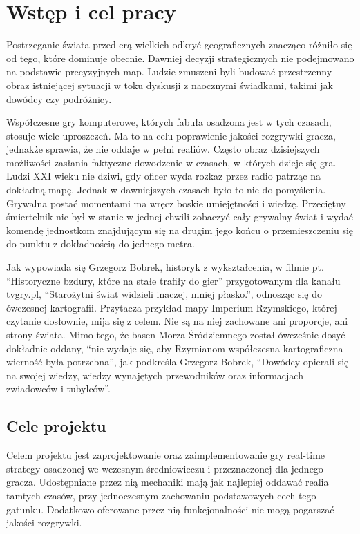 \chapter{Wstęp i cel pracy}\label{chap:introduction}

Postrzeganie świata przed erą wielkich odkryć geograficznych znacząco różniło się od tego, które dominuje obecnie. Dawniej
decyzji strategicznych nie podejmowano na podstawie precyzyjnych map. Ludzie zmuszeni byli  budować  przestrzenny obraz
istniejącej sytuacji  w toku dyskusji z naocznymi świadkami, takimi jak dowódcy czy podróżnicy.

Współczesne gry komputerowe, których fabuła osadzona jest w tych czasach, stosuje wiele uproszczeń. Ma to na celu
poprawienie jakości rozgrywki gracza, jednakże sprawia, że nie oddaje w pełni realiów. Często obraz dzisiejszych
możliwości zasłania faktyczne dowodzenie w czasach, w których dzieje się gra. Ludzi XXI wieku nie dziwi, gdy oficer wyda
rozkaz przez radio patrząc na dokładną mapę. Jednak w dawniejszych czasach było to nie do pomyślenia. Grywalna postać
momentami ma wręcz boskie umiejętności i wiedzę. Przeciętny śmiertelnik nie był w stanie w jednej chwili zobaczyć cały
grywalny świat i wydać komendę jednostkom znajdującym się na drugim jego końcu o przemieszczeniu się do punktu z
dokładnością do jednego metra.

Jak wypowiada się Grzegorz Bobrek, historyk z wykształcenia, w filmie pt. “Historyczne bzdury, które na stałe trafiły do
gier” przygotowanym dla kanału tvgry.pl, “Starożytni świat widzieli inaczej, mniej płasko.”, odnosząc się do ówczesnej
kartografii. Przytacza przykład mapy Imperium Rzymskiego, której czytanie dosłownie, mija się z celem. Nie są na niej
zachowane ani proporcje, ani strony świata. Mimo tego, że basen Morza Śródziemnego został ówcześnie dosyć dokładnie
oddany, “nie wydaje się, aby Rzymianom współczesna kartograficzna wierność była potrzebna”, jak podkreśla Grzegorz Bobrek,
“Dowódcy opierali się na swojej wiedzy, wiedzy wynajętych przewodników oraz informacjach zwiadowców i tubylców”.

\section{Cele projektu}
Celem projektu jest zaprojektowanie oraz zaimplementowanie gry real-time strategy osadzonej we wczesnym średniowieczu i
przeznaczonej dla jednego gracza. Udostępniane przez nią mechaniki mają jak najlepiej oddawać realia tamtych czasów, przy
jednoczesnym zachowaniu podstawowych cech tego gatunku. Dodatkowo oferowane przez nią funkcjonalności nie mogą pogarszać
jakości rozgrywki.

